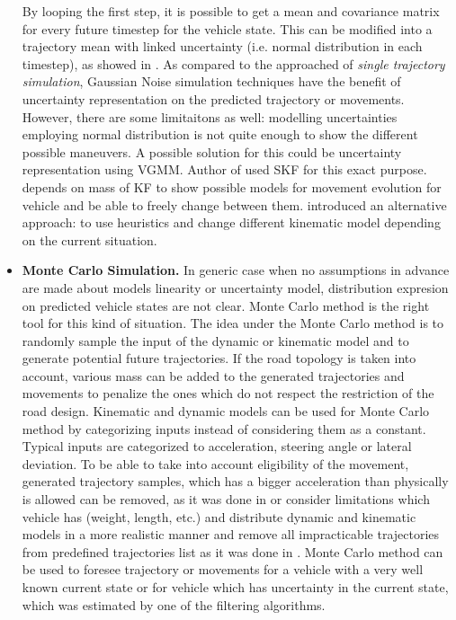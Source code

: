 \begin{itemize}
	By looping the first step, it is possible to get a mean and covariance matrix for every future timestep for the vehicle state. This can be modified into a trajectory mean with linked uncertainty (i.e. normal distribution in each timestep), as showed in \cite{GaussianNoiseIII, GaussianNoiseI}. As compared to the approached of \textit{single trajectory simulation}, Gaussian Noise simulation techniques have the benefit of uncertainty representation on the predicted trajectory or movements. However, there are some limitaitons as well: modelling uncertainties employing normal distribution is not quite enough to show the different possible maneuvers. A possible solution for this could be uncertainty representation using \gls{VGMM}. Author of \cite{SKFI} used \gls{SKF} for this exact purpose. \cite{GaussianNoiseII} depends on mass of \gls{KF} to show possible models for movement evolution for vehicle and be able to freely change between them. \cite{kinematicII} introduced an alternative approach: to use heuristics and change different kinematic model depending on the current situation.
	
	\item \textbf{Monte Carlo Simulation.} In generic case  when no assumptions in advance are made about models linearity or uncertainty model, distribution expresion on predicted vehicle states are not clear. Monte Carlo method is the right tool for this kind of situation. The idea under the Monte Carlo method is to randomly sample the input of the dynamic or kinematic model and to generate potential future trajectories. If the road topology is taken into account, various mass can be added to the generated trajectories and movements to penalize the ones which do not respect the restriction of the road design. Kinematic and dynamic models can be used for Monte Carlo method by categorizing inputs instead of considering them as a constant. Typical inputs are categorized to acceleration, steering angle or lateral deviation. To be able to take into account eligibility of the movement, generated trajectory samples, which has a bigger acceleration than physically is allowed can be removed, as it was done in \cite{MonteCarlo} or consider limitations which vehicle has (weight, length, etc.) and distribute dynamic and kinematic models in a more realistic manner and remove all impracticable trajectories from predefined trajectories list as it was done in \cite{MonteCarloI}. Monte Carlo method can be used to foresee trajectory or movements for a vehicle with a very well known current state or for vehicle which has uncertainty in the current state, which was estimated by one of the filtering algorithms.
\end{itemize}

